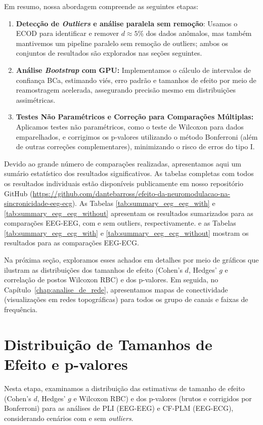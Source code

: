 Em resumo, nossa abordagem compreende as seguintes etapas:
\begin{enumerate}
    \item \textbf{Detecção de \textit{Outliers} e análise paralela sem remoção}: Usamos o ECOD para identificar e remover \(d\approx5\)\%  dos dados anômalos, mas também mantivemos um pipeline paralelo sem remoção de outliers; ambos os conjuntos de resultados são explorados nas seções seguintes.
    \item \textbf{Análise \textit{Bootstrap} com GPU:} Implementamos o cálculo de intervalos de confiança BCa, estimando viés, erro padrão e tamanhos de efeito por meio de reamostragem acelerada, assegurando precisão mesmo em distribuições assimétricas.
    \item \textbf{Testes Não Paramétricos e Correção para Comparações Múltiplas:} Aplicamos testes não paramétricos, como o teste de Wilcoxon para dados emparelhados, e corrigimos os p-valores utilizando o método Bonferroni (além de outras correções complementares), minimizando o risco de erros do tipo I.
\end{enumerate}

Devido ao grande número de comparações realizadas, apresentamos aqui um sumário estatístico dos resultados significativos. As tabelas completas com todos os resultados individuais estão disponíveis publicamente em nosso repositório GitHub \cite{barros2025repository} (\url{https://github.com/dantebarross/efeito-da-neuromodulacao-na-sincronicidade-eeg-ecg}). As Tabelas \ref{tab:summary_eeg_eeg_with} e \ref{tab:summary_eeg_eeg_without} apresentam os resultados sumarizados para as comparações EEG-EEG, com e sem outliers, respectivamente. e as Tabelas \ref{tab:summary_eeg_ecg_with} e \ref{tab:summary_eeg_ecg_without} mostram os resultados para as comparações EEG-ECG.

Na próxima seção, exploramos esses achados em detalhes por meio de gráficos que ilustram as distribuições dos tamanhos de efeito (Cohen's \(d\), Hedges' \(g\) e correlação de postos Wilcoxon RBC) e dos p-valores. Em seguida, no Capítulo~\ref{chap:analise_de_rede}, apresentamos mapas de conectividade (visualizações em redes topográficas) para todos os grupo de canais e faixas de frequência.

\section{Distribuição de Tamanhos de Efeito e p-valores}
\label{sec:effect_size_distribution}
Nesta etapa, examinamos a distribuição das estimativas de tamanho de efeito (Cohen's \(d\), Hedges' \(g\)  e Wilcoxon RBC) e dos p-valores (brutos e corrigidos por Bonferroni) para as análises de PLI (EEG-EEG) e CF-PLM (EEG-ECG), considerando cenários com e sem \textit{outliers}. 

